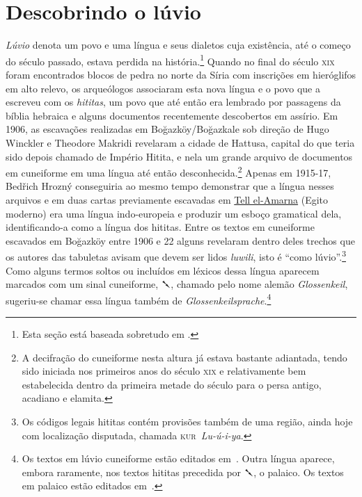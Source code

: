 
\chapter{Descobrindo o lúvio}

\emph{Lúvio} denota um povo e uma língua e seus dialetos cuja existência,
até o começo do século passado, estava perdida na história.\footnote{Esta seção
	está baseada sobretudo em \textcite{CHLI11,Melchert2003,Hoffner2008}.}
Quando no final do século \textsc{xix} foram encontrados blocos de pedra no
norte da Síria com inscrições em hieróglifos em alto relevo, os arqueólogos
associaram esta
nova língua e o povo que a escreveu com os \emph{hititas}, um povo que até
então era lembrado por passagens da bíblia hebraica e alguns documentos
recentemente descobertos em assírio.
Em 1906, as escavações realizadas em Boğazköy\slash{}Boğazkale sob direção de
Hugo Winckler e Theodore Makridi revelaram a cidade de Hattusa,
capital do que teria sido depois chamado de Império Hitita, e nela um grande
arquivo de documentos em cuneiforme em uma língua até então
desconhecida.\footnote{A decifração do cuneiforme nesta altura já estava
	bastante adiantada, tendo sido iniciada nos primeiros anos do século
	\textsc{xix} e relativamente bem estabelecida dentro da primeira metade do
	século para o persa antigo, acadiano e elamita.}
Apenas em 1915-17, Bedřich Hrozný conseguiria ao mesmo tempo demonstrar que a
língua nesses arquivos e em duas cartas previamente escavadas em
\href{https://pleiades.stoa.org/places/149576487}{Tell el-Amarna}
(Egito moderno) era uma língua indo-europeia e produzir um esboço gramatical
dela, identificando-a como a língua dos hititas.
Entre os textos em cuneiforme escavados em Boğazköy entre 1906 e 22 alguns revelaram
dentro deles trechos que os autores das tabuletas avisam que devem ser lidos
\emph{luwili}, isto é ``como lúvio''.\footnote{Os códigos legais hititas
	contém provisões também de uma região, ainda hoje
	com localização disputada, chamada \mbox{\textsc{kur} \textit{Lu-ú-i-ya}}.}
Como alguns termos soltos ou incluídos em léxicos dessa língua
aparecem marcados com um sinal cuneiforme, \foreignlanguage{hittite}{𒃵}, chamado
pelo nome alemão \emph{Glossenkeil}, sugeriu-se chamar essa língua também de
\emph{Glossenkeilsprache}.\footnote{Os textos em lúvio cuneiforme estão
	editados em~\textcites{Starke1985}{YakubovichMouton2023}.
	Outra língua aparece, embora raramente,
	nos textos hititas precedida por \foreignlanguage{hittite}{𒃵}, o palaico. Os
	textos em palaico estão editados em~\textcite{Carruba1970}.}

